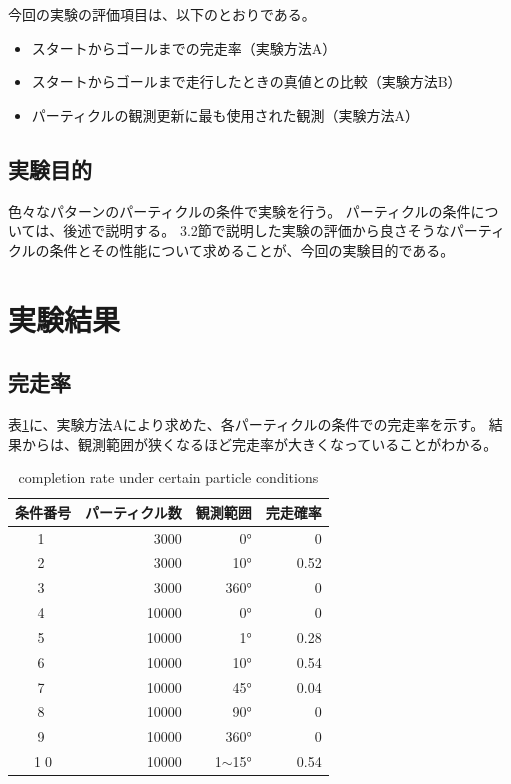 \documentclass{jarticle}
\begin{document}
今回の実験の評価項目は、以下のとおりである。
\begin{itemize}
  \item スタートからゴールまでの完走率（実験方法A）
  \item スタートからゴールまで走行したときの真値との比較（実験方法B）
  \item パーティクルの観測更新に最も使用された観測（実験方法A）
\end{itemize}

\subsection{実験目的}

色々なパターンのパーティクルの条件で実験を行う。
パーティクルの条件については、後述で説明する。
3.2節で説明した実験の評価から良さそうなパーティクルの条件とその性能について求めることが、今回の実験目的である。

\section{実験結果}%

\subsection{完走率}

表\ref{table:完走率}に、実験方法Aにより求めた、各パーティクルの条件での完走率を示す。
結果からは、観測範囲が狭くなるほど完走率が大きくなっていることがわかる。

\begin{table}[htbp]
  \caption{completion rate under certain particle conditions}
  \label{table:完走率}
  \begin{tabular}{|c|r|r|r|} \hline
  条件番号 & パーティクル数 & 観測範囲  & 完走確率 \\ \hline \hline
  \textcircled{\scriptsize 1} & 3000 & 0° & 0 \\ \hline
  \textcircled{\scriptsize 2} & 3000 & 10° & 0.52 \\ \hline
  \textcircled{\scriptsize 3} & 3000 & 360° & 0 \\ \hline
  \textcircled{\scriptsize 4} & 10000 & 0° & 0 \\ \hline
  \textcircled{\scriptsize 5} & 10000 & 1° & 0.28 \\ \hline
  \textcircled{\scriptsize 6} & 10000 & 10° & 0.54 \\ \hline
  \textcircled{\scriptsize 7} & 10000 & 45° & 0.04 \\ \hline
  \textcircled{\scriptsize 8} & 10000 & 90° & 0 \\ \hline
  \textcircled{\scriptsize 9} & 10000 & 360° & 0 \\ \hline
  \textcircled{\scriptsize 10} & 10000 & 1$\sim$15° & 0.54 \\ \hline
  \end{tabular}
\end{table}
\end{document}
